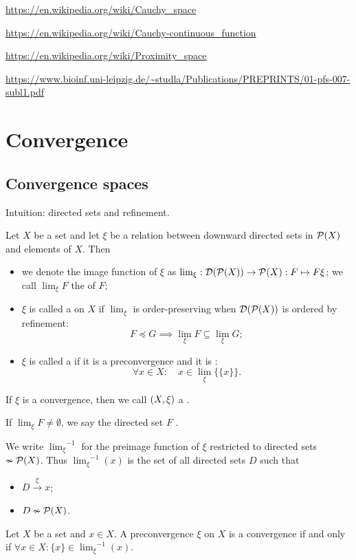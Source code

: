 \url{https://en.wikipedia.org/wiki/Cauchy_space}

\url{https://en.wikipedia.org/wiki/Cauchy-continuous_function}

\url{https://en.wikipedia.org/wiki/Proximity_space}

\url{https://www.bioinf.uni-leipzig.de/~studla/Publications/PREPRINTS/01-pfs-007-subl1.pdf}

\chapter{Convergence}
\section{Convergence spaces}
Intuition: directed sets and refinement.

\begin{definition}
Let $X$ be a set and let $\xi$ be a relation between downward directed sets in $\operatorname{\mathcal{P}}(X)$ and elements of $X$. Then
\begin{itemize}
\item we denote the image function of $\xi$ as $\lim_\xi: \operatorname{\mathcal{D}}(\operatorname{\mathcal{P}}(X)) \to \operatorname{\mathcal{P}}(X): F\mapsto F\xi$; we call $\lim_\xi F$ the  of $F$;
\item $\xi$ is called a  on $X$ if $\lim_\xi$ is order-preserving when $\operatorname{\mathcal{D}}(\operatorname{\mathcal{P}}(X))$ is ordered by refinement:
\[ F \preceq G \implies \lim_\xi F \subseteq \lim_\xi G; \]
\item $\xi$ is called a  if it is a preconvergence and it is :
\[ \forall x\in X: \quad x\in \lim_\xi \big\{\{x\}\big\}. \]
\end{itemize}
If $\xi$ is a convergence, then we call $\left( X, \xi \right)$ a .

If $\lim_\xi F \neq \emptyset$, we say the directed set $F$ .
\end{definition}
We write ${\lim_\xi}^{-1}$ for the preimage function of $\xi$ restricted to directed sets $\nsim \operatorname{\mathcal{P}}(X)$. Thus ${\lim_\xi}^{-1}(x)$ is the set of all directed sets $D$ such that
\begin{itemize}
\item $D\overset{\xi}{\longrightarrow} x$;
\item $D \nsim \operatorname{\mathcal{P}}(X)$.
\end{itemize}

\begin{lemma}
Let $X$ be a set and $x\in X$. A preconvergence $\xi$ on $X$ is a convergence \textup{if and only if} $\forall x\in X: \{x\} \in {\lim_\xi}^{-1}(x)$.
\end{lemma}

